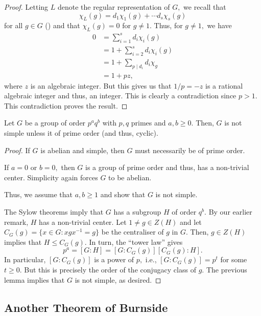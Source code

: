 \begin{proof}
	Letting $L$ denote the regular representation of $G,$ we recall that
	\begin{equation*} 
		\chi_L(g) = d_1\chi_1(g) + \cdots d_s\chi_s(g)
	\end{equation*}
	for all $g \in G$ () and that $\chi_L(g) = 0$ for $g \neq 1.$ Thus, for $g \neq 1,$ we have
	\begin{align*} 
		0 &= \sum_{i = 1}^{s}d_i\chi_i(g)\\
		&= 1 + \sum_{i = 2}^{s}d_i\chi_i(g)\\
		&= 1 + \sum_{p \mid d_i}d_i\chi_g\\
		&= 1 + pz,
	\end{align*}
	where $z$ is an algebraic integer. But this gives us that $1/p = -z$ is a rational algebraic integer and thus, an integer. This is clearly a contradiction since $p > 1.$ This contradiction proves the result.
\end{proof}

\begin{thm}[Burnside]
	Let $G$ be a group of order $p^aq^b$ with $p, q$ primes and $a, b \ge 0.$ Then, $G$ is not simple unless it of prime order (and thus, cyclic).
\end{thm}
\begin{proof} 
	If $G$ is abelian and simple, then $G$ must necessarily be of prime order. 

	If $a = 0$ or $b = 0,$ then $G$ is a group of prime order and thus, has a non-trivial center. Simplicity again forces $G$ to be abelian. 

	Thus, we assume that $a, b \ge 1$ and show that $G$ is not simple.

	The Sylow theorems imply that $G$ has a subgroup $H$ of order $q^b.$ By our earlier remark, $H$ has a non-trivial center. Let $1 \neq g \in Z(H)$ and let $C_G(g) = \{x \in G : xgx^{-1} = g\}$ be the centraliser of $g$ in $G.$ Then, $g \in Z(H)$ implies that $H \le C_G(g).$ In turn, the ``tower law'' gives
	\begin{equation*} 
		p^a = [G:H] = [G:C_G(g)][C_G(g):H].
	\end{equation*}
	In particular, $[G:C_G(g)]$ is a power of $p,$ i.e., $[G:C_G(g)] = p^t$ for some $t \ge 0.$ But this is precisely the order of the conjugacy class of $g.$ The previous lemma implies that $G$ is not simple, as desired.
\end{proof}

\subsection{Another Theorem of Burnside}

